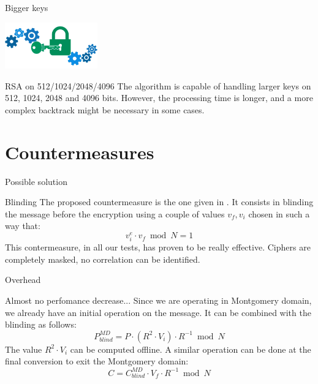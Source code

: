 \documentclass[aspectratio=169]{beamer}
\begin{document}
\begin{frame}{Bigger keys}
  \begin{center}
    \includegraphics[width=4cm]{./graphics/key}
  \end{center}
  \begin{block}{RSA on 512/1024/2048/4096}
		The algorithm is capable of handling larger keys on 512, 1024, 2048 and 4096 bits.
    However, the processing time is longer, and a more complex backtrack might be necessary in some cases.
	\end{block}
\end{frame}



\section{Countermeasures}
\begin{frame}{Possible solution}
    \begin{block}{Blinding}
		The proposed countermeasure is the one given in \cite{kocher1996timing}.
		It consists in blinding the message before the encryption using a couple of values $v_f, v_i$ chosen in such a way that:
		\begin{equation*}
			v_i^e \cdot v_f \bmod N = 1
		\end{equation*}
        This contermeasure, in all our tests, has proven to be really effective. Ciphers are completely masked, no correlation can be identified.
    \end{block}
\end{frame}

\begin{frame}[c]{Overhead}
  \begin{block}{Almost no perfomance decrease...}
    Since we are operating in Montgomery domain, we already have an initial operation on the message. It can be combined with the blinding as follows:
    \begin{equation*}
      P_{blind}^{MD} = P \cdot ( R^2 \cdot V_i ) \cdot R^{-1} \bmod N
    \end{equation*}
    The value $R^2 \cdot V_i$ can be computed offline.
    A similar operation can be done at the final conversion to exit the Montgomery domain:
    \begin{equation*}
      C = C_{blind}^{MD} \cdot V_f \cdot R^{-1} \bmod N
    \end{equation*}
  \end{block}
\end{frame}
\end{document}
